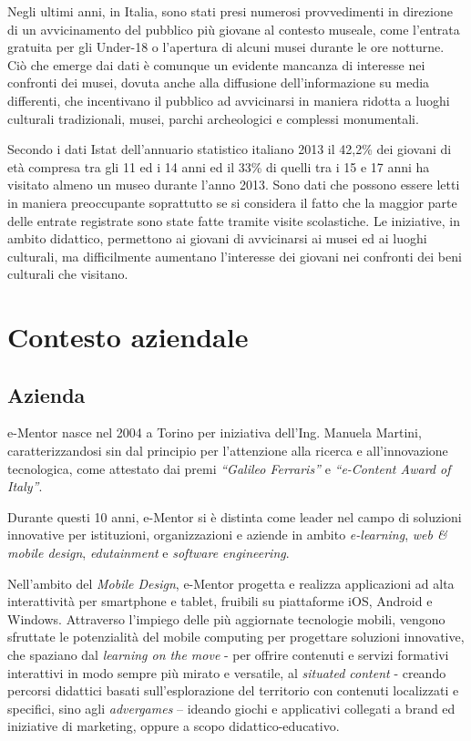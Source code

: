 Negli ultimi anni, in Italia, sono stati presi numerosi provvedimenti in direzione di un avvicinamento del pubblico più giovane al contesto museale, come l’entrata gratuita per gli Under-18 o l’apertura di alcuni musei durante le ore notturne. Ciò che emerge dai dati è comunque un evidente mancanza di interesse nei confronti dei musei, dovuta anche alla diffusione dell’informazione su media differenti, che incentivano il pubblico ad avvicinarsi in maniera ridotta a luoghi culturali tradizionali, musei, parchi archeologici e complessi monumentali.

Secondo i dati Istat dell'annuario statistico italiano 2013 \cite{DatiIstatMusei} il 42,2\% dei giovani di età compresa tra gli 11 ed i 14 anni ed il 33\% di quelli tra i 15 e 17 anni ha visitato almeno un museo durante l’anno 2013. Sono dati che possono essere letti in maniera preoccupante soprattutto se si considera il fatto che la maggior parte delle entrate registrate sono state fatte tramite visite scolastiche. Le iniziative, in ambito didattico, permettono ai giovani di avvicinarsi ai musei ed ai luoghi culturali, ma difficilmente aumentano l’interesse dei giovani nei confronti dei beni culturali che visitano.  

\section{Contesto aziendale}
\label{sec:contesto_aziendale}

\subsection{Azienda}
\label{sec:azienda}

e-Mentor nasce nel 2004 a Torino per iniziativa dell’Ing. Manuela Martini, caratterizzandosi sin dal principio per l’attenzione alla ricerca e all’innovazione tecnologica, come attestato dai premi \textit{“Galileo Ferraris”} e \textit{“e-Content Award of Italy”}. 

Durante questi 10 anni, e-Mentor si è distinta come leader nel campo di soluzioni innovative per istituzioni, organizzazioni e aziende in ambito \textit{e-learning}, \textit{web \& mobile design}, \textit{edutainment} e \textit{software engineering}.

Nell’ambito del \textit{Mobile Design}, e-Mentor progetta e realizza applicazioni ad alta interattività per smartphone e tablet, fruibili su piattaforme iOS, Android e Windows. Attraverso l’impiego delle più aggiornate tecnologie mobili, vengono sfruttate le potenzialità del mobile computing per progettare soluzioni innovative, che spaziano dal \textit{learning on the move} - per offrire contenuti e servizi formativi interattivi in modo sempre più mirato e versatile, al \textit{situated content} - creando percorsi didattici basati sull'esplorazione del territorio con contenuti localizzati e specifici, sino agli \textit{advergames} – ideando giochi e applicativi collegati a brand ed iniziative di marketing, oppure a scopo didattico-educativo.

